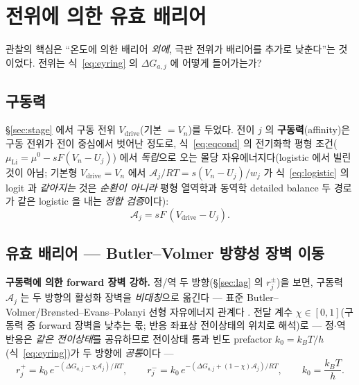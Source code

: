 \documentclass[11pt,a4paper]{article}
\newcommand{\drive}{\mathrm{drive}}
\begin{document}
\section{전위에 의한 유효 배리어}\label{sec:barrier}
관찰의 핵심은 ``온도에 의한 배리어 \emph{외에}, 극판 전위가 배리어를 추가로 낮춘다''는 것이었다.
전위는 식~\eqref{eq:eyring} 의 $\Delta G_{a,j}$ 에 어떻게 들어가는가?

\subsection{구동력}
\S\ref{sec:stage} 에서 구동 전위 $V_\drive$(기본 $=V_n$)를 두었다. 전이 $j$ 의 \textbf{구동력}(affinity)은
구동 전위가 전이 중심에서 벗어난 정도로, 식~\eqref{eq:eqcond} 의 전기화학 평형 조건($\mu_\mathrm{Li}=\mu^0-sF(V_n-U_j)$)
에서 \emph{독립}으로 오는 몰당 자유에너지다(logistic 에서 빌린 것이 아님; 기본형 $V_\drive=V_n$ 에서 $\mathcal A_j/RT=
s(V_n-U_j)/w_j$ 가 식~\eqref{eq:logistic} 의 logit 과 \emph{같아지는} 것은 \emph{순환이 아니라} 평형 열역학과 동역학
detailed balance 두 경로가 같은 logistic 을 내는 \emph{정합 검증}이다):
\begin{equation}
\mathcal A_j=sF\,(V_\drive-U_j).
\label{eq:affinity}
\end{equation}

\subsection{유효 배리어 — Butler--Volmer 방향성 장벽 이동}
\textbf{구동력에 의한 forward 장벽 강하.} 정/역 두 방향(\S\ref{sec:lag} 의 $r_j^\pm$)을 보면, 구동력 $\mathcal A_j$ 는
두 방향의 활성화 장벽을 \emph{비대칭}으로 옮긴다 — 표준 Butler--Volmer/Brønsted--Evans--Polanyi 선형 자유에너지
관계다 \cite{bardfaulkner,evanspolanyi1938}. 전달 계수 $\chi\in[0,1]$(구동력 중 forward 장벽을 낮추는 몫; 반응
좌표상 전이상태의 위치로 해석)로 — 정$\cdot$역 반응은 \emph{같은 전이상태}를 공유하므로 전이상태 통과 빈도
prefactor $k_0=k_BT/h$(식~\eqref{eq:eyring})가 두 방향에 \emph{공통}이다 —
\begin{equation}
r_j^+=k_0\,e^{-(\Delta G_{a,j}-\chi\mathcal A_j)/RT},\qquad
r_j^-=k_0\,e^{-(\Delta G_{a,j}+(1-\chi)\mathcal A_j)/RT},\qquad k_0=\frac{k_BT}{h}.
\label{eq:bv}
\end{equation}
\end{document}
